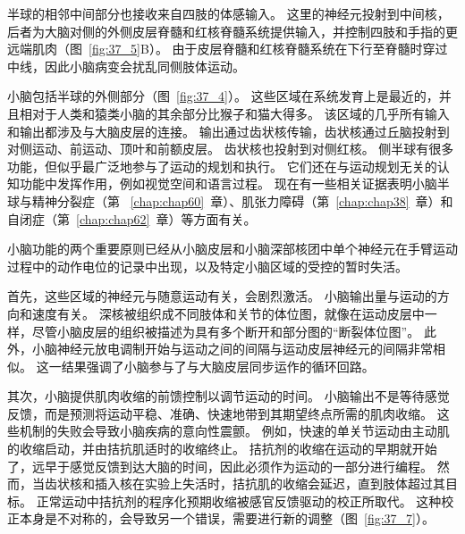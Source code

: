 半球的相邻中间部分也接收来自四肢的体感输入。
这里的神经元投射到中间核，后者为大脑对侧的外侧皮层脊髓和红核脊髓系统提供输入，并控制四肢和手指的更远端肌肉（图~\ref{fig:37_5}B）。
由于皮层脊髓和红核脊髓系统在下行至脊髓时穿过中线，因此小脑病变会扰乱同侧肢体运动。


小脑包括半球的外侧部分（图~\ref{fig:37_4}）。 这些区域在系统发育上是最近的，并且相对于人类和猿类小脑的其余部分比猴子和猫大得多。
该区域的几乎所有输入和输出都涉及与大脑皮层的连接。
输出通过齿状核传输，齿状核通过丘脑投射到对侧运动、前运动、顶叶和前额皮层。
齿状核也投射到对侧红核。
侧半球有很多功能，但似乎最广泛地参与了运动的规划和执行。
它们还在与运动规划无关的认知功能中发挥作用，例如视觉空间和语言过程。
现在有一些相关证据表明小脑半球与精神分裂症（第 ~\ref{chap:chap60}~章）、肌张力障碍（第~\ref{chap:chap38}~章）和自闭症（第~\ref{chap:chap62}~章）等方面有关。


小脑功能的两个重要原则已经从小脑皮层和小脑深部核团中单个神经元在手臂运动过程中的动作电位的记录中出现，以及特定小脑区域的受控的暂时失活。


首先，这些区域的神经元与随意运动有关，会剧烈激活。
小脑输出量与运动的方向和速度有关。
深核被组织成不同肢体和关节的体位图，就像在运动皮层中一样，尽管小脑皮层的组织被描述为具有多个断开和部分图的“断裂体位图”。
此外，小脑神经元放电调制开始与运动之间的间隔与运动皮层神经元的间隔非常相似。
这一结果强调了小脑参与了与大脑皮层同步运作的循环回路。


其次，小脑提供肌肉收缩的前馈控制以调节运动的时间。
小脑输出不是等待感觉反馈，而是预测将运动平稳、准确、快速地带到其期望终点所需的肌肉收缩。
这些机制的失败会导致小脑疾病的意向性震颤。
例如，快速的单关节运动由主动肌的收缩启动，并由拮抗肌适时的收缩终止。
拮抗剂的收缩在运动的早期就开始了，远早于感觉反馈到达大脑的时间，因此必须作为运动的一部分进行编程。
然而，当齿状核和插入核在实验上失活时，拮抗肌的收缩会延迟，直到肢体超过其目标。
正常运动中拮抗剂的程序化预期收缩被感官反馈驱动的校正所取代。
这种校正本身是不对称的，会导致另一个错误，需要进行新的调整（图~\ref{fig:37_7}）。


